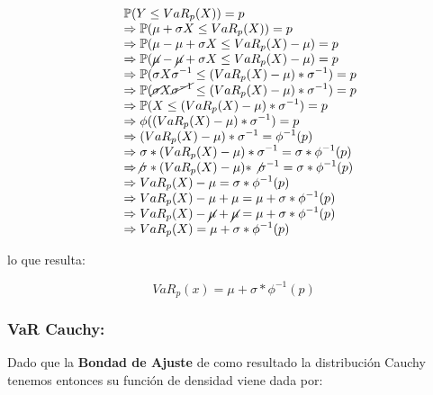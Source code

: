 \documentclass[]{article}
\begin{document}
\[
\begin{array}{rl}
&\displaystyle \mathbb{P}(Y \leq VaR_{p}(X)) = p\\
&\displaystyle \Rightarrow \mathbb{P}(\mu + \sigma X \leq VaR_{p}(X)) = p\\
&\displaystyle \Rightarrow \mathbb{P}(\mu - \mu + \sigma X \leq VaR_{p}(X)- \mu) = p\\
&\displaystyle \Rightarrow \mathbb{P}(\cancel{\mu} - \cancel{\mu} + \sigma X \leq VaR_{p}(X)- \mu) = p\\
&\displaystyle \Rightarrow \mathbb{P}(\sigma X \sigma^{-1} \leq (VaR_{p}(X) -\mu) * \sigma^{-1}) = p\\
&\displaystyle \Rightarrow \mathbb{P}(\cancel{\sigma} X \cancel{\sigma^{-1}} \leq (VaR_{p}(X) -\mu) * \sigma^{-1}) = p\\
&\displaystyle \Rightarrow \mathbb{P}(X \leq (VaR_{p}(X) -\mu) * \sigma^{-1}) = p\\
&\displaystyle \Rightarrow \phi((VaR_{p}(X) -\mu) * \sigma^{-1}) = p\\
&\displaystyle \Rightarrow (VaR_{p}(X) -\mu) * \sigma^{-1} = \phi^{-1}(p)\\
&\displaystyle \Rightarrow \sigma * {(VaR_{p}(X) -\mu) * \sigma^{-1}} = \sigma * \phi^{-1}(p)\\
&\displaystyle \Rightarrow \not{\sigma} * {(VaR_{p}(X) -\mu) * \not{\sigma^{-1}}} = \sigma * \phi^{-1}(p)\\
&\displaystyle \Rightarrow VaR_{p}(X) -\mu = \sigma * \phi^{-1}(p)\\
&\displaystyle \Rightarrow VaR_{p}(X) -\mu + \mu = \mu + \sigma * \phi^{-1}(p)\\
&\displaystyle \Rightarrow VaR_{p}(X) -\cancel{\mu} + \cancel{\mu} = \mu + \sigma * \phi^{-1}(p)\\
&\displaystyle \Rightarrow VaR_{p}(X) = \mu + \sigma * \phi^{-1}(p)
\end{array}\]

lo que resulta:

\[VaR_p(x)=\mu+\sigma* \phi^{-1}(p)\]

\hypertarget{var-cauchy}{%
\subsubsection{\texorpdfstring{\textbf{VaR
Cauchy:}}{VaR Cauchy:}}\label{var-cauchy}}

Dado que la \textbf{Bondad de Ajuste} de como resultado la distribución
Cauchy tenemos entonces su función de densidad viene dada por:
\end{document}
